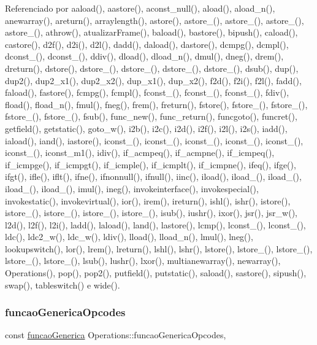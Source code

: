 Referenciado por aaload(), aastore(), aconst\+\_\+null(), aload(), aload\+\_\+n(), anewarray(), areturn(), arraylength(), astore(), astore\+\_(), astore\+\_(), astore\+\_(), astore\+\_(), athrow(), atualizar\+Frame(), baload(), bastore(), bipush(), caload(), castore(), d2f(), d2i(), d2l(), dadd(), daload(), dastore(), dcmpg(), dcmpl(), dconst\+\_(), dconst\+\_(), ddiv(), dload(), dload\+\_\+n(), dmul(), dneg(), drem(), dreturn(), dstore(), dstore\+\_(), dstore\+\_(), dstore\+\_(), dstore\+\_(), dsub(), dup(), dup2(), dup2\+\_\+x1(), dup2\+\_\+x2(), dup\+\_\+x1(), dup\+\_\+x2(), f2d(), f2i(), f2l(), fadd(), faload(), fastore(), fcmpg(), fcmpl(), fconst\+\_(), fconst\+\_(), fconst\+\_(), fdiv(), fload(), fload\+\_\+n(), fmul(), fneg(), frem(), freturn(), fstore(), fstore\+\_(), fstore\+\_(), fstore\+\_(), fstore\+\_(), fsub(), func\+\_\+new(), func\+\_\+return(), funcgoto(), funcret(), getfield(), getstatic(), goto\+\_\+w(), i2b(), i2c(), i2d(), i2f(), i2l(), i2s(), iadd(), iaload(), iand(), iastore(), iconst\+\_(), iconst\+\_(), iconst\+\_(), iconst\+\_(), iconst\+\_(), iconst\+\_(), iconst\+\_\+m1(), idiv(), if\+\_\+acmpeq(), if\+\_\+acmpne(), if\+\_\+icmpeq(), if\+\_\+icmpge(), if\+\_\+icmpgt(), if\+\_\+icmple(), if\+\_\+icmplt(), if\+\_\+icmpne(), ifeq(), ifge(), ifgt(), ifle(), iflt(), ifne(), ifnonnull(), ifnull(), iinc(), iload(), iload\+\_(), iload\+\_(), iload\+\_(), iload\+\_(), imul(), ineg(), invokeinterface(), invokespecial(), invokestatic(), invokevirtual(), ior(), irem(), ireturn(), ishl(), ishr(), istore(), istore\+\_(), istore\+\_(), istore\+\_(), istore\+\_(), isub(), iushr(), ixor(), jsr(), jsr\+\_\+w(), l2d(), l2f(), l2i(), ladd(), laload(), land(), lastore(), lcmp(), lconst\+\_(), lconst\+\_(), ldc(), ldc2\+\_\+w(), ldc\+\_\+w(), ldiv(), lload(), lload\+\_\+n(), lmul(), lneg(), lookupswitch(), lor(), lrem(), lreturn(), lshl(), lshr(), lstore(), lstore\+\_(), lstore\+\_(), lstore\+\_(), lstore\+\_(), lsub(), lushr(), lxor(), multianewarray(), newarray(), Operations(), pop(), pop2(), putfield(), putstatic(), saload(), sastore(), sipush(), swap(), tableswitch() e wide().

\mbox{\label{classOperations_a7cb32c09e40f348cabf0b7af374ad278}} 
\subsubsection{\texorpdfstring{funcao\+Generica\+Opcodes}{funcaoGenericaOpcodes}}
{\footnotesize\ttfamily const \hyperlink{Operations_8h_a41b02f2392b85fc1d04e0d8e11c43398}{funcao\+Generica} Operations\+::funcao\+Generica\+Opcodes\hspace{0.3cm}{\ttfamily [static]}, {\ttfamily [private]}}



